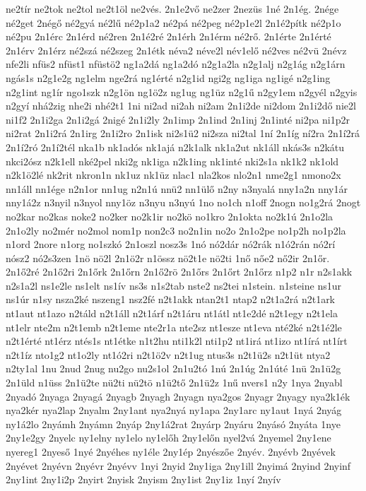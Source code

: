 {ne2tír
ne2tok
ne2tol
ne2t1öl
ne2vés.
2n1e2vő
ne2zer
2nezüs
1né
2n1ég.
2nége
né2get
2négő
né2gyá
né2lű
né2p1a2
né2pá
né2peg
né2p1e2l
2n1é2pítk
né2p1o
né2pu
2n1érc
2n1érd
né2ren
2n1é2ré
2n1érh
2n1érm
né2rő.
2n1érte
2n1érté
2n1érv
2n1érz
né2szá
né2szeg
2n1étk
néva2
néve2l
név1elő
né2ves
né2vü
2névz
nfe2li
nfüs2
nfüst1
nfüstö2
ng1a2dá
ng1a2dó
n2g1a2la
n2g1alj
n2g1ág
n2g1árn
ngás1s
n2g1e2g
ng1elm
nge2rá
ng1érté
n2g1id
ngi2g
ng1iga
ng1igé
n2g1ing
n2g1int
ng1ír
ngo1szk
n2g1ön
ng1ö2z
ng1ug
ng1üz
n2g1ű
n2gy1em
n2gyél
n2gyis
n2gyí
nhá2zig
nhe2i
nhé2t1
1ni
ni2ad
ni2ah
ni2am
2n1i2de
ni2dom
2n1i2dő
nie2l
ni1f2
2n1i2ga
2n1i2gá
2nigé
2n1i2ly
2n1imp
2n1ind
2n1inj
2n1inté
ni2pa
ni1p2r
ni2rat
2n1i2rá
2n1irg
2n1i2ro
2n1isk
ni2s1ü2
ni2sza
ni2tal
1ní
2n1íg
ní2ra
2n1í2rá
2n1í2ró
2n1í2tél
nka1b
nk1adós
nk1ajá
n2k1alk
nk1a2ut
nk1áll
nkás3s
n2kátu
nkci2ósz
n2k1ell
nké2pel
nki2g
nk1iga
n2k1ing
nk1inté
nki2s1a
nk1k2
nk1old
n2k1ö2lé
nk2rit
nkron1n
nk1uz
nk1üz
nlac1
nla2kos
nlo2n1
nme2g1
nmono2x
nn1áll
nn1ége
n2n1or
nn1ug
n2n1ú
nnü2
nn1ülő
n2ny
n3nyalá
nny1a2n
nny1ár
nny1á2z
n3nyil
n3nyol
nny1öz
n3nyu
n3nyú
1no
no1ch
n1off
2nogn
no1g2rá
2nogt
no2kar
no2kas
noke2
no2ker
no2k1ir
no2kö
no1kro
2n1okta
no2k1ú
2n1o2la
2n1o2ly
no2mér
no2mol
nom1p
non2c3
no2n1in
no2o
2n1o2pe
no1p2h
no1p2la
n1ord
2nore
n1org
no1szkó
2n1oszl
nosz3s
1nó
nó2dár
nó2rák
n1ó2rán
nó2rí
nósz2
nó2s3zen
1nö
nö2l
2n1ö2r
n1össz
nö2t1e
nö2ti
1nő
nőe2
nő2ir
2n1őr.
2n1ő2ré
2n1ő2ri
2n1őrk
2n1őrn
2n1ő2rö
2n1őrs
2n1őrt
2n1őrz
n1p2
n1r
n2s1akk
n2s1a2l
ns1e2le
ns1elt
ns1ív
ns3s
n1s2tab
nste2
ns2tei
n1stein.
n1steine
ns1ur
ns1úr
n1sy
nsza2ké
nszeng1
nsz2fé
n2t1akk
ntan2t1
ntap2
n2t1a2rá
n2t1ark
nt1aut
nt1azo
n2táld
n2t1áll
n2t1árf
n2t1áru
nt1átl
nt1e2dé
n2t1egy
n2t1ela
nt1elr
nte2m
n2t1emb
n2t1eme
nte2r1a
nte2sz
nt1esze
nt1eva
nté2ké
n2t1é2le
n2t1érté
nt1érz
ntés1s
nt1étke
n1t2hu
nti1k2l
nti1p2
nt1irá
nt1izo
nt1írá
nt1írt
n2t1íz
nto1g2
nt1o2ly
nt1ó2ri
n2t1ö2v
n2t1ug
ntus3s
n2t1ü2s
n2t1üt
ntya2
n2ty1al
1nu
2nud
2nug
nu2go
nu2s1ol
2n1u2tó
1nú
2n1úg
2n1úté
1nü
2n1ü2g
2n1üld
n1üss
2n1ü2te
nü2ti
nü2tö
n1ü2tő
2n1ü2z
1nű
nvers1
n2y
1nya
2nyabl
2nyadó
2nyaga
2nyagá
2nyagb
2nyagh
2nyagn
nya2gos
2nyagr
2nyagy
nya2k1ék
nya2kér
nya2lap
2nyalm
2ny1ant
nya2nyá
ny1apa
2ny1arc
ny1aut
1nyá
2nyág
ny1á2lo
2nyámh
2nyámn
2nyáp
2ny1á2rat
2nyárp
2nyáru
2nyásó
2nyáta
1nye
2ny1e2gy
2nyelc
ny1elny
ny1elo
ny1előh
2ny1előn
nyel2vá
2nyemel
2ny1ene
nyereg1
2nyeső
1nyé
2nyéhes
ny1éle
2ny1ép
2nyészőe
2nyév.
2nyévb
2nyévek
2nyévet
2nyévn
2nyévr
2nyévv
1nyi
2nyid
2ny1iga
2ny1ill
2nyimá
2nyind
2nyinf
2ny1int
2ny1i2p
2nyirt
2nyisk
2nyism
2ny1ist
2ny1iz
1nyí
2nyív
}
